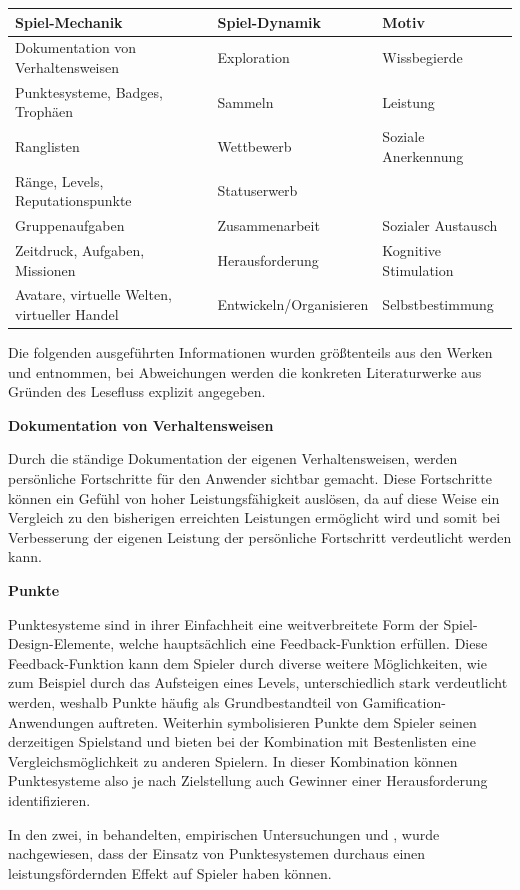 \documentclass[bibliography=totoc,listof=totoc,BCOR=5mm,DIV=12,oneside]{scrbook}
\begin{document}
\bigskip
\begin{tabularx}{\textwidth}{l|l|X}
	\toprule
	\textbf{Spiel-Mechanik} & \textbf{Spiel-Dynamik} & \textbf{Motiv}\\ \midrule
	Dokumentation von Verhaltensweisen & Exploration & Wissbegierde\\
	Punktesysteme, Badges, Trophäen & Sammeln  & Leistung\\
	Ranglisten & Wettbewerb & Soziale Anerkennung\\ 
	Ränge, Levels, Reputationspunkte & Statuserwerb  & \\
	Gruppenaufgaben & Zusammenarbeit  & Sozialer Austausch\\
	Zeitdruck, Aufgaben, Missionen & Herausforderung & Kognitive Stimulation\\ 
	Avatare, virtuelle Welten, virtueller Handel & Entwickeln/Organisieren & Selbstbestimmung \\ 
	\bottomrule
\end{tabularx}
\label{tab:spielDesignElemente}

\par \bigskip Die folgenden ausgeführten Informationen wurden größtenteils aus den Werken \citep[Kapitel 2.2.2 Analyse einzelner Spiel-Design-Elemente]{Sailer2016} und \citep[Kapitel 4 The Gamification Toolkit Game Elements]{werbach2012win} entnommen, bei Abweichungen werden die konkreten Literaturwerke aus Gründen des Lesefluss explizit angegeben.

\par \bigskip \textbf{Dokumentation von Verhaltensweisen}
\par Durch die ständige Dokumentation der eigenen Verhaltensweisen, werden persönliche Fortschritte für den Anwender sichtbar gemacht. Diese Fortschritte können ein Gefühl von hoher Leistungsfähigkeit auslösen, da auf diese Weise ein Vergleich zu den bisherigen erreichten Leistungen ermöglicht wird und somit bei Verbesserung der eigenen Leistung der persönliche Fortschritt verdeutlicht werden kann.

\par \bigskip \textbf{Punkte}
\par Punktesysteme sind in ihrer Einfachheit eine weitverbreitete Form der Spiel-Design-Elemente, welche hauptsächlich eine Feedback-Funktion erfüllen. Diese Feedback-Funktion kann dem Spieler durch diverse weitere Möglichkeiten, wie zum Beispiel durch das Aufsteigen eines Levels, unterschiedlich stark verdeutlicht werden, weshalb Punkte häufig als Grundbestandteil von Gamification-Anwendungen auftreten. Weiterhin symbolisieren Punkte dem Spieler seinen derzeitigen Spielstand und bieten bei der Kombination mit Bestenlisten eine Vergleichsmöglichkeit zu anderen Spielern. In dieser Kombination können Punktesysteme also je nach Zielstellung auch Gewinner einer Herausforderung identifizieren.
\par In den zwei, in \citep{Sailer2016} behandelten, empirischen Untersuchungen \citep{mekler2013disassembling} und \citep{mekler2013points}, wurde nachgewiesen, dass der Einsatz von Punktesystemen durchaus einen leistungsfördernden Effekt auf Spieler haben können.
\end{document}

